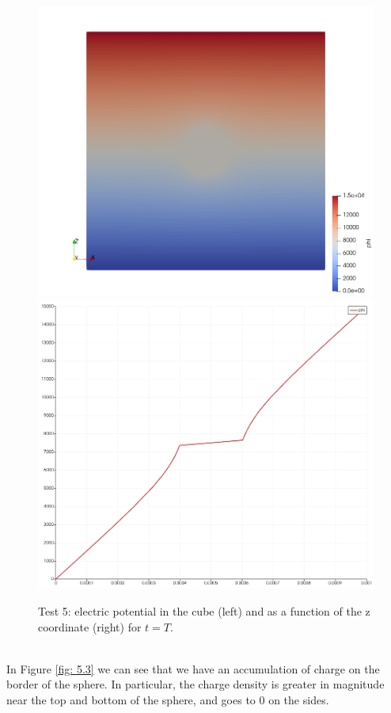 \documentclass{Configuration_Files/PoliMi3i_thesis}
\begin{document}
\begin{figure}[h!]
    \centering
   \includegraphics[scale=0.2]{Images/5.phi_3d.jpeg}
   \includegraphics[scale=0.2]{Images/5.phi.jpeg}
    \caption {Test 5: electric potential in the cube (left) and as a function of the z coordinate (right) for $t=T$.}
    \label{fig: 5.2}
\end{figure}
\\In Figure \ref{fig: 5.3} we can see that we have an accumulation of charge on the border of the sphere. In particular, the charge density is greater in magnitude near the top and bottom of the sphere, and goes to 0 on the sides.
\end{document}
